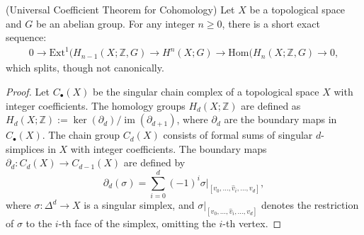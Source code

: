 \begin{theorem}
	{(Universal Coefficient Theorem for Cohomology) \cite[\S 3.1]{hatcher2005algebraic}}
	\label{universalcoefficients} Let $X$ be a topological space and $G$ be an abelian
	group. For any integer $n \geq 0$, there is a short exact sequence:
	\begin{align*}
		0 \rightarrow \text{Ext}^{1}(H_{n-1}(X;\mathbb{Z},G) \rightarrow H^{n}(X;G) \rightarrow \text{Hom}(H_{n}(X;\mathbb{Z},G) \rightarrow 0,
	\end{align*}
	which splits, though not canonically.
\end{theorem}

\begin{proof}
	Let $C_{\bullet}(X)$ be the singular chain complex of a topological space $X$ with
	integer coefficients. The homology groups $H_{d}(X; \mathbb{Z})$ are defined
	as
	$H_{d}(X; \mathbb{Z}) := \ker(\partial_{d}) / \operatorname{im}(\partial_{d+1})$,
	where $\partial_{d}$ are the boundary maps in $C_{\bullet}(X)$. The chain
	group $C_{d}(X)$ consists of formal sums of singular $d$-simplices in $X$ with
	integer coefficients. The boundary maps $\partial_{d}: C_{d}(X) \rightarrow C_{d-1}
	(X)$ are defined by
	\[
		\partial_{d}(\sigma) = \sum_{i=0}^{d}(-1)^{i} \sigma|_{[v_0, \ldots, \hat{v}_i,
		\ldots, v_d]},
	\]
	where $\sigma: \Delta^{d} \rightarrow X$ is a singular simplex, and
	$\sigma|_{[v_0, \ldots, \hat{v}_i, \ldots, v_d]}$ denotes the restriction of
	$\sigma$ to the $i$-th face of the simplex, omitting the $i$-th vertex.


\end{proof}
